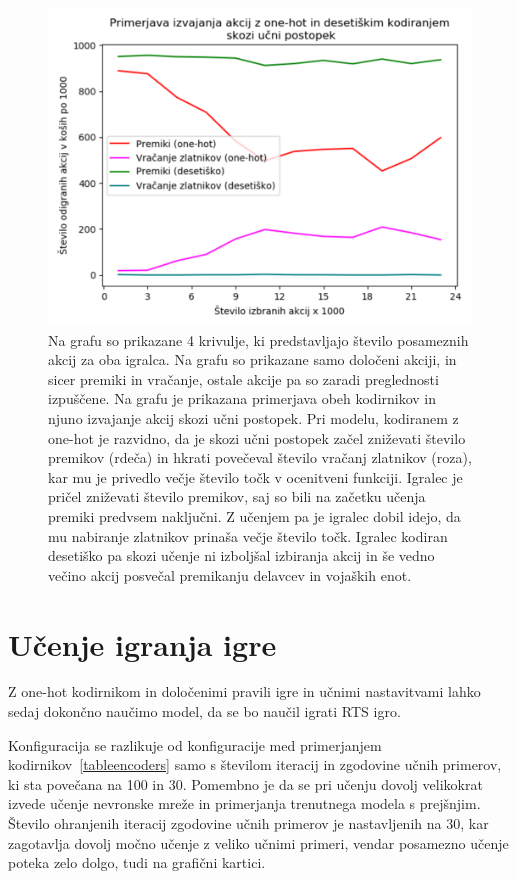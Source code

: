 \documentclass[a4paper, 12pt]{book}
\begin{document}
\begin{figure}[h]
	\begin{center}
		\includegraphics[width=1\textwidth]{photos/onehot_numeric_primerjava_akcij.pdf}
	\end{center}
	\caption{Na grafu so prikazane 4 krivulje, ki predstavljajo število posameznih akcij za oba igralca. Na grafu so prikazane samo določeni akciji, in sicer premiki in vračanje, ostale akcije pa so zaradi preglednosti izpuščene.
		Na grafu je prikazana primerjava obeh kodirnikov in njuno izvajanje akcij skozi učni postopek.
		Pri modelu, kodiranem z one-hot je razvidno, da je skozi učni postopek začel zniževati število premikov (rdeča) in hkrati povečeval število vračanj zlatnikov (roza), kar mu je privedlo večje število točk v ocenitveni funkciji.
		Igralec je pričel zniževati število premikov, saj so bili na začetku učenja premiki predvsem naključni. Z učenjem pa je igralec dobil idejo, da mu nabiranje zlatnikov prinaša večje število točk.
	Igralec kodiran desetiško pa skozi učenje ni izboljšal izbiranja akcij in še vedno večino akcij posvečal premikanju delavcev in vojaških enot. }
	\label{onehotPrimerjavaAkcij}
\end{figure}


\section{Učenje igranja igre}
Z one-hot kodirnikom in določenimi pravili igre in učnimi nastavitvami lahko sedaj dokončno naučimo model, da se bo naučil igrati RTS igro.

Konfiguracija se razlikuje od konfiguracije med primerjanjem kodirnikov~\ref{tableencoders} samo s številom iteracij in zgodovine učnih primerov, ki sta povečana na 100 in 30.
Pomembno je da se pri učenju dovolj velikokrat izvede učenje nevronske mreže in primerjanja trenutnega modela s prejšnjim.
Število ohranjenih iteracij zgodovine učnih primerov je nastavljenih na 30, kar zagotavlja dovolj močno učenje z veliko učnimi primeri, vendar posamezno učenje poteka zelo dolgo, tudi na grafični kartici.
\end{document}
